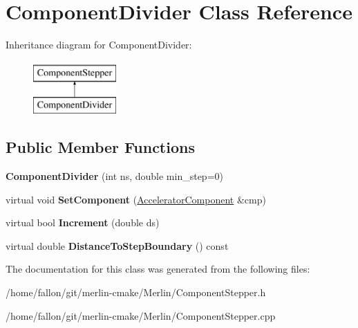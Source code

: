 \hypertarget{classComponentDivider}{}\section{Component\+Divider Class Reference}
\label{classComponentDivider}
Inheritance diagram for Component\+Divider\+:\begin{figure}[H]
\begin{center}
\leavevmode
\includegraphics[height=2.000000cm]{classComponentDivider}
\end{center}
\end{figure}
\subsection*{Public Member Functions}
\begin{DoxyCompactItemize}
\item 
\mbox{\label{classComponentDivider_aca9b92aa1de8a03d4ee464a64819de56}} 
{\bfseries Component\+Divider} (int ns, double min\+\_\+step=0)
\item 
\mbox{\label{classComponentDivider_a213ba55b81fedda805634d20d79b389b}} 
virtual void {\bfseries Set\+Component} (\hyperlink{classAcceleratorComponent}{Accelerator\+Component} \&cmp)
\item 
\mbox{\label{classComponentDivider_a1cd3ca95fade3a16f66e5ed6ed617d8d}} 
virtual bool {\bfseries Increment} (double ds)
\item 
\mbox{\label{classComponentDivider_a2df40bedd77f7f20312b748ab7557197}} 
virtual double {\bfseries Distance\+To\+Step\+Boundary} () const
\end{DoxyCompactItemize}


The documentation for this class was generated from the following files\+:\begin{DoxyCompactItemize}
\item 
/home/fallon/git/merlin-\/cmake/\+Merlin/Component\+Stepper.\+h\item 
/home/fallon/git/merlin-\/cmake/\+Merlin/Component\+Stepper.\+cpp\end{DoxyCompactItemize}

